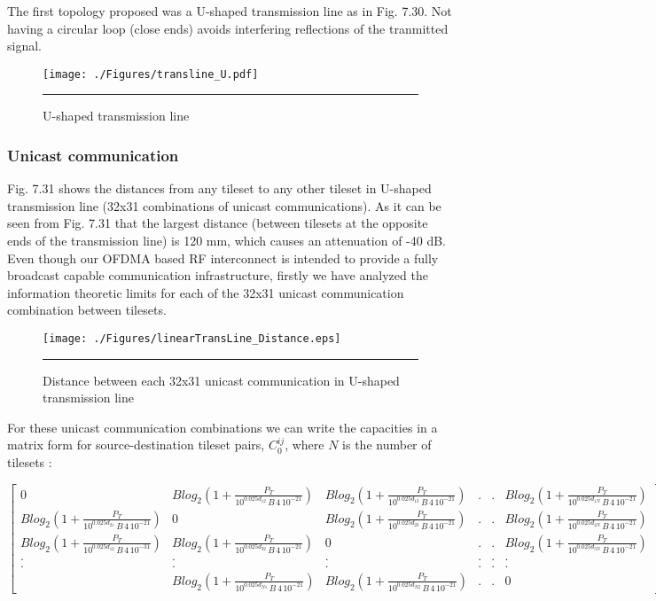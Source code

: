 The first topology proposed was a U-shaped transmission line as in Fig. 7.30. Not having a circular loop (close ends) avoids interfering reflections of the tranmitted signal.  


\begin{figure}[htbp]
  \centering
    \texttt{[image: ./Figures/transline\_U.pdf]}
    \rule{35em}{0.5pt}
  \caption[U-shaped transmission line]{U-shaped transmission line}
  \label{fig:Electron}
\end{figure}

 

\subsubsection{Unicast communication}
Fig. 7.31 shows the distances from any tileset to any other tileset in U-shaped transmission line (32x31 combinations of unicast communications). As it can be seen from Fig. 7.31 that the largest distance (between tilesets at the opposite ends of the transmission line) is 120 mm, which causes an attenuation of -40 dB. Even though our OFDMA based RF interconnect is intended to provide a fully broadcast capable communication infrastructure, firstly we have analyzed the information theoretic limits for each of the 32x31 unicast communication combination between tilesets.

\begin{figure}[htbp]
  \centering
    \texttt{[image: ./Figures/linearTransLine\_Distance.eps]}
    \rule{35em}{0.5pt}
  \caption[Distance between each 32x31 unicast communication in U-shaped transmission line]{Distance between each 32x31 unicast communication in U-shaped transmission line}
  \label{fig:Electron}
\end{figure}

For these unicast communication combinations we can write the capacities in a matrix form for source-destination tileset pairs, $C_{0}^{ij}$, where $N$ is the number of tilesets : 

\bigskip
\resizebox{1.0\linewidth}{!}
{
$\begin{bmatrix}
 0  &Blog_{2}(1+\frac{P_{T}}{10^{0.025d_{12}}\,B\,4\,10^{-21}})  &Blog_{2}(1+\frac{P_{T}}{10^{0.025d_{13}}\,B\,4\,10^{-21}})  &.  &. &Blog_{2}(1+\frac{P_{T}}{10^{0.025d_{1N}}\,B\,4\,10^{-21}}) \\ 
Blog_{2}(1+\frac{P_{T}}{10^{0.025d_{21}}\,B\,4\,10^{-21}}) &0   &Blog_{2}(1+\frac{P_{T}}{10^{0.025d_{23}}\,B\,4\,10^{-21}})  &.  &. &Blog_{2}(1+\frac{P_{T}}{10^{0.025d_{2N}}\,B\,4\,10^{-21}}) \\ 
Blog_{2}(1+\frac{P_{T}}{10^{0.025d_{12}}\,B\,4\,10^{-31}})   &Blog_{2}(1+\frac{P_{T}}{10^{0.025d_{32}}\,B\,4\,10^{-21}})  &0 &.  &. &Blog_{2}(1+\frac{P_{T}}{10^{0.025d_{3N}}\,B\,4\,10^{-21}}) \\ 
 .  &. &.  &. &.  &. \\ 
 .  &. &.  &. &.  &. \\ 
  &Blog_{2}(1+\frac{P_{T}}{10^{0.025d_{N1}}\,B\,4\,10^{-21}})  &Blog_{2}(1+\frac{P_{T}}{10^{0.025d_{N2}}\,B\,4\,10^{-21}}) &. &.  &0  
\end{bmatrix}$
}
\bigskip

